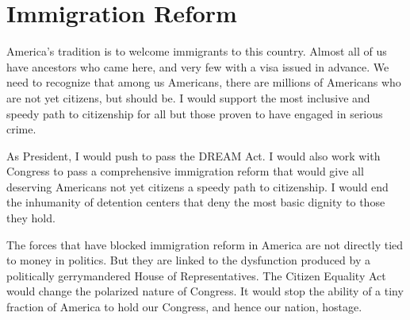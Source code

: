 \section{Immigration Reform}

America's tradition is to welcome immigrants to this country. Almost all of us have ancestors who came here, and very few with a visa issued in advance. We need to recognize that among us Americans, there are millions of Americans who are not yet citizens, but should be. I would support the most inclusive and speedy path to citizenship for all but those proven to have engaged in serious crime.

As President, I would push to pass the DREAM Act. I would also work with Congress to pass a comprehensive immigration reform that would give all deserving Americans not yet citizens a speedy path to citizenship. I would end the inhumanity of detention centers that deny the most basic dignity to those they hold.

The forces that have blocked immigration reform in America are not directly tied to money in politics. But they are linked to the dysfunction produced by a politically gerrymandered House of Representatives. The Citizen Equality Act would change the polarized nature of Congress. It would stop the ability of a tiny fraction of America to hold our Congress, and hence our nation, hostage.
